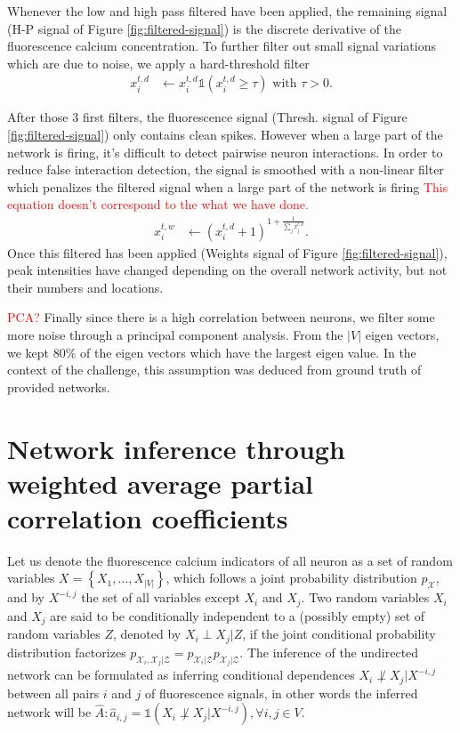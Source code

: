 \documentclass[wcp]{jmlr}
\begin{document}
Whenever the low and high pass filtered have been applied, the remaining signal
(H-P signal of Figure \ref{fig:filtered-signal}) is the discrete
derivative of the fluorescence calcium concentration. To further filter out
small signal variations which are due to noise, we apply a hard-threshold
filter
\begin{align}
x^{t,d}_i &\leftarrow x^{t,d}_i \mathbb{1}(x^{t,d}_i \geq \tau) \text{ with } \tau > 0.
\end{align}

After those 3 first filters, the fluorescence signal (Thresh. signal of
Figure \ref{fig:filtered-signal}) only contains clean spikes. However when a large
part of the network is firing, it's difficult to detect pairwise neuron
interactions. In order to reduce false interaction detection,
the signal is smoothed with a non-linear filter which penalizes
the filtered signal when a large part of the network is firing
\textcolor{red}{This equation doesn't correspond to the what we have done.}
\begin{align}
 x^{t,w}_i  &\leftarrow (x^{t,d}_i + 1 )^{1 + \frac{1}{\sum_{j} x^{t,d}_j}}.
\end{align}
Once this filtered has been applied (Weights signal of
Figure \ref{fig:filtered-signal}), peak intensities have
changed depending on the overall network activity, but not their numbers and
locations.

\textcolor{red}{PCA?} Finally since there is a high correlation between neurons,
we filter some more noise through a principal component analysis. From the $|V|$
eigen vectors, we kept $80\%$ of the eigen vectors which have the largest eigen
value. In the context of the challenge, this assumption was deduced from ground
truth of provided networks.

\section{Network inference through weighted average partial correlation
         coefficients}
\label{sec:inference}

Let us denote the fluorescence calcium indicators of all neuron
as a set of random variables $X = \left\{X_1, \ldots, X_{|V|}\right\}$, which follows
a joint probability distribution $p_\mathcal{X}$, and by
$X^{-i,j}$ the set of all variables except $X_i$ and $X_j$.
Two random variables $X_i$ and $X_j$ are said to be conditionally independent
to a (possibly empty) set of random variables $Z$, denoted by $X_i \perp X_j | Z$,
if the joint conditional probability distribution factorizes
$p_{\mathcal{X}_i, \mathcal{X}_j|\mathcal{Z}} = p_{\mathcal{X}_i|\mathcal{Z}}
p_{\mathcal{X}_j|\mathcal{Z}}$.  The inference of the undirected network
can be formulated as inferring conditional dependences
$X_i \not\perp X_j | X^{-i,j}$ between all pairs $i$ and $j$ of fluorescence
signals, in other words the inferred network will be
$\hat{A}: \hat{a}_{i,j} = \mathbb{1}(X_i \not\perp X_j | X^{-i,j}), \forall i, j \in V$.
\end{document}
